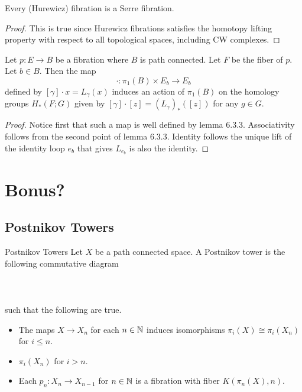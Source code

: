 \documentclass[a4paper]{article}
\begin{document}
\begin{lmm}{}{} Every (Hurewicz) fibration is a Serre fibration. \tcbline
\begin{proof}
This is true since Hurewicz fibrations satisfies the homotopy lifting property with respect to all topological spaces, including CW complexes. 
\end{proof}
\end{lmm}

\begin{prp}{}{} Let $p:E\to B$ be a fibration where $B$ is path connected. Let $F$ be the fiber of $p$. Let $b\in B$. Then the map $$\cdot:\pi_1(B)\times E_b\to E_b$$ defined by $[\gamma]\cdot x=L_\gamma(x)$ induces an action of $\pi_1(B)$ on the homology groups $H_\ast(F;G)$ given by $[\gamma]\cdot[z]=(L_\gamma)_\ast([z])$ for any $g\in G$. \tcbline
\begin{proof}
Notice first that such a map is well defined by lemma 6.3.3. Associativity follows from the second point of lemma 6.3.3. Identity follows the unique lift of the identity loop $e_b$ that gives $L_{e_b}$ is also the identity. 
\end{proof}
\end{prp}


\pagebreak
\section{Bonus?}
\subsection{Postnikov Towers}
\begin{defn}{Postnikov Towers}{} Let $X$ be a path connected space. A Postnikov tower is the following commutative diagram \\~\\
\\~\\
such that the following are true. 
\begin{itemize}
\item The maps $X\to X_n$ for each $n\in\mathbb{N}$ induces isomorphisms $\pi_i(X)\cong\pi_i(X_n)$ for $i\leq n$. 
\item $\pi_i(X_n)$ for $i>n$. 
\item Each $p_n:X_n\to X_{n-1}$ for $n\in\mathbb{N}$ is a fibration with fiber $K(\pi_n(X),n)$. 
\end{itemize}
\end{defn}
\end{document}
